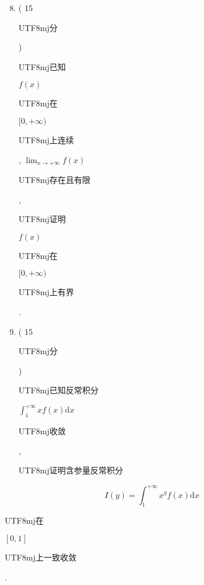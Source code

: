 \documentclass[10pt]{article}
\begin{document}
\begin{enumerate}
  \setcounter{enumi}{7}
  \item ( 15 \begin{CJK}{UTF8}{mj}分\end{CJK}) \begin{CJK}{UTF8}{mj}已知\end{CJK} $f(x)$ \begin{CJK}{UTF8}{mj}在\end{CJK} $[0,+\infty)$ \begin{CJK}{UTF8}{mj}上连续\end{CJK}, $\lim _{x \rightarrow+\infty} f(x)$ \begin{CJK}{UTF8}{mj}存在且有限\end{CJK}, \begin{CJK}{UTF8}{mj}证明\end{CJK} $f(x)$ \begin{CJK}{UTF8}{mj}在\end{CJK} $[0,+\infty)$ \begin{CJK}{UTF8}{mj}上有界\end{CJK}.

  \item ( 15 \begin{CJK}{UTF8}{mj}分\end{CJK}) \begin{CJK}{UTF8}{mj}已知反常积分\end{CJK} $\int_{1}^{+\infty} x f(x) \mathrm{d} x$ \begin{CJK}{UTF8}{mj}收敛\end{CJK}, \begin{CJK}{UTF8}{mj}证明含参量反常积分\end{CJK}

\end{enumerate}
$$
I(y)=\int_{1}^{+\infty} x^{y} f(x) \mathrm{d} x
$$
\begin{CJK}{UTF8}{mj}在\end{CJK} $[0,1]$ \begin{CJK}{UTF8}{mj}上一致收敛\end{CJK}.
\end{document}
